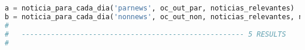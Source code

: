 \begin{lstlisting}[language=Python]
a = noticia_para_cada_dia('parnews', oc_out_par, noticias_relevantes)
b = noticia_para_cada_dia('nonnews', oc_out_non, noticias_relevantes, np = True)
#
#   ----------------------------------------------------- 5 RESULTS
#


\end{lstlisting}




















